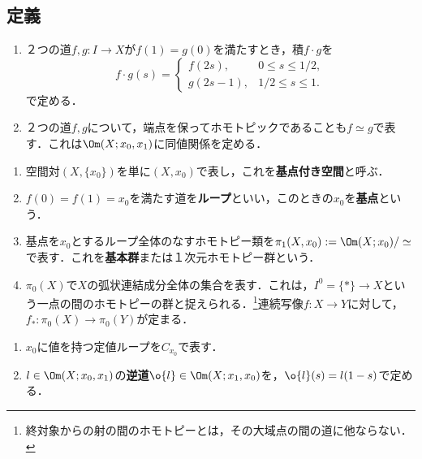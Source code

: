 \documentclass[uplatex, dvipdfmx]{jsreport}
\begin{document}
\subsection{定義}

\begin{definition}[path]\mbox{}
    \begin{enumerate}
        \item ２つの道$f,g:I\to X$が$f(1)=g(0)$を満たすとき，積$f\cdot g$を
        \[f\cdot g(s)=\begin{cases}
            f(2s),&0\le s\le 1/2,\\
            g(2s-1),&1/2\le s\le 1.
        \end{cases}\]
        で定める．
        \item ２つの道$f,g$について，端点を保ってホモトピックであることも$f\simeq g$で表す．これは$\Om(X;x_0,x_1)$に同値関係を定める．
    \end{enumerate}
\end{definition}

\begin{definition}\mbox{}\label{def-0th-homotopy-set}
    \begin{enumerate}
        \item 空間対$(X,\{x_0\})$を単に$(X,x_0)$で表し，これを\textbf{基点付き空間}と呼ぶ．
        \item $f(0)=f(1)=x_0$を満たす道を\textbf{ループ}といい，このときの$x_0$を\textbf{基点}という．
        \item 基点を$x_0$とするループ全体のなすホモトピー類を$\pi_1(X,x_0):=\Om(X;x_0)/\simeq$で表す．これを\textbf{基本群}または１次元ホモトピー群という．
        \item $\pi_0(X)$で$X$の弧状連結成分全体の集合を表す．これは，$I^0=\{*\}\to X$という一点の間のホモトピーの群と捉えられる．\footnote{終対象からの射の間のホモトピーとは，その大域点の間の道に他ならない．}連続写像$f:X\to Y$に対して，$f_*:\pi_0(X)\to\pi_0(Y)$が定まる．
    \end{enumerate}
\end{definition}

\begin{notation}\mbox{}
    \begin{enumerate}
        \item $x_0$に値を持つ定値ループを$C_{x_0}$で表す．
        \item $l\in\Om(X;x_0,x_1)$の\textbf{逆道}$\o{l}\in\Om(X;x_1,x_0)$を，$\o{l}(s)=l(1-s)$で定める．
    \end{enumerate}
\end{notation}
\end{document}
